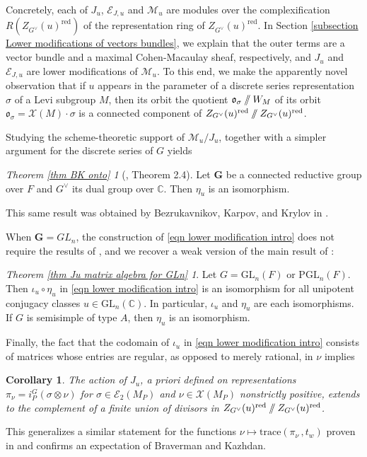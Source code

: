 \documentclass[10pt]{article}
\newcommand{\git}{\mathbin{
  \mathchoice{/\mkern-6mu/}%
    {/\mkern-6mu/}%
    {/\mkern-5mu/}%
    {/\mkern-5mu/}}}%
\newcommand{\X}{\mathcal{X}}
\newcommand{\Ee}{\mathcal{E}}
\newcommand{\trace}[2]{\mathrm{trace}\left({#1}\,,{#2}\right)}
\newcommand{\C}{\mathbb{C}}
\newcommand{\G}{\mathbf{G}}
\newcommand{\GL}{\mathrm{GL}}
\newcommand{\PGL}{\mathrm{PGL}}
\newtheorem{cor}{Corollary}
\theoremstyle{definition}
\theoremstyle{remark}
\newcommand{\Zur}{Z_{G^\vee}(u)^{\mathrm{red}}}
\begin{document}
Concretely, each of $J_u$, $\Ee_{J,u}$ and $\mathcal{M}_u$ are modules over the complexification $R(\Zur)$ of the 
representation ring of $\Zur$. In Section \ref{subsection Lower modifications of vectors bundles}, we 
explain that the outer terms are a vector bundle and a maximal Cohen-Macaulay sheaf, respectively, and $J_u$ and $\Ee_{J,u}$ are lower modifications of $\mathcal{M}_u$. 
To this end, we make the apparently novel observation that if $u$ appears in the parameter of a 
discrete series representation $\sigma$ of a Levi subgroup $M$, then its orbit the quotient $\mathfrak{o}_\sigma\git W_M$ of its orbit $\mathfrak{o}_\sigma=\X(M)\cdot\sigma$ is a connected
component of $\Zur\git\Zur$.

Studying the scheme-theoretic support of $\mathcal{M}_u/J_u$, together with a simpler argument for the 
discrete series of $G$ yields
\theoremstyle{theorem}
\newtheorem*{thm:onto}{Theorem \ref{thm BK onto}}
\begin{thm:onto}[\cite{BK}, Theorem 2.4]
Let $\G$ be a connected reductive group over $F$ and $G^\vee$ its dual group over $\C$. 
Then $\eta_u$ is an isomorphism.
\end{thm:onto}
%
This same result %
was obtained by Bezrukavnikov, Karpov, and Krylov in \cite[Prop. 1.3.6]{BKK}.

When $\G=GL_n$, the construction of \eqref{eqn lower modification intro} does not require the results of
\cite{BO}, and we recover a weak version of the main result of \cite{XiAMemoir}:
%
\theoremstyle{theorem}
\newtheorem*{thm:GL}{Theorem \ref{thm Ju matrix algebra for GLn}}
\begin{thm:GL}
Let $G=\GL_n(F)$ or $\PGL_n(F)$. Then $\iota_u\circ\eta_u$ in \eqref{eqn lower modification intro} is an isomorphism for all unipotent
conjugacy classes $u\in\GL_n(\C)$. In particular, $\iota_u$ and $\eta_u$ are each isomorphisms.
If $G$ is semisimple of type $A$, then $\eta_u$ is an isomorphism. 
\end{thm:GL}
%
Finally, the fact that the codomain of $\iota_u$ in \eqref{eqn lower modification intro} consists of matrices whose entries are regular, as opposed to merely rational, in $\nu$ implies 
%
\begin{cor}
The action of $J_u$, \textit{a priori} defined on representations $\pi_\nu=i_{P}^G(\sigma\otimes\nu)$
for $\sigma\in\Ee_2(M_P)$ and $\nu\in\X(M_P)$ nonstrictly positive, extends to the complement of a
finite union of divisors in $\Zur\git\Zur$.
\end{cor}
%
This generalizes a similar statement for the functions $\nu\mapsto\trace{\pi_\nu}{t_w}$ proven
in \cite{Plancherel} and confirms an expectation of Braverman and Kazhdan.
\end{document}
